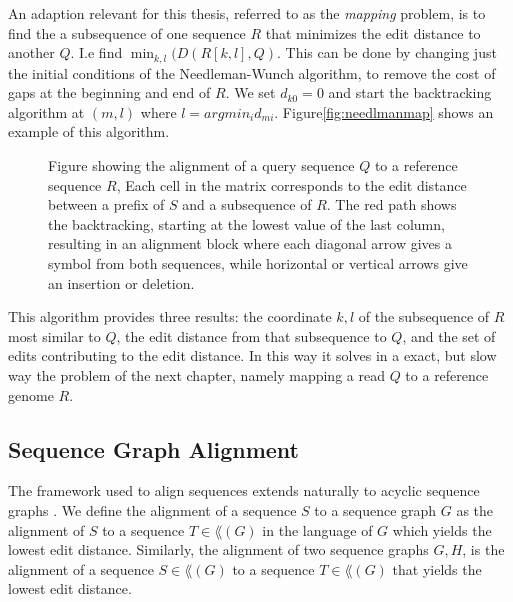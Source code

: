 An adaption relevant for this thesis, referred to as the \emph{mapping} problem, is to find the a subsequence of one sequence $R$ that minimizes the edit distance to another $Q$. I.e find $\min_{k, l}(D(R[k, l], Q)$.
This can be done by changing just the initial conditions of the Needleman-Wunch algorithm, to remove the cost of gaps at the beginning and end of $R$. We set $d_{k0} = 0$ and start the backtracking algorithm at $(m, l)$ where $l=arg min_i d_{mi}$. Figure\ref{fig:needlmanmap} shows an example of this algorithm.
\begin{figure}
  \begin{tikzpicture}
    
  \end{tikzpicture}
  \caption{Figure showing the alignment of a query sequence $Q$ to a reference sequence $R$, 
    Each cell in the matrix corresponds to the edit distance between a prefix of $S$ and a subsequence of  $R$. The red path shows the backtracking, starting at the lowest value of the last column, resulting in an alignment block where each diagonal arrow gives a symbol from both sequences, while horizontal or vertical arrows give an insertion or deletion.}
  \label{fig:needlemanmap}
\end{figure}
This algorithm provides three results: the coordinate $k, l$ of the subsequence of $R$ most similar to $Q$, the edit distance from that subsequence to $Q$, and the set of edits contributing to the edit distance. In this way it solves in a exact, but slow way the problem of the next chapter, namely mapping a read $Q$ to a reference genome $R$.

\subsection{Sequence Graph Alignment}
The framework used to align sequences extends naturally to acyclic sequence graphs \cite{hein, poa}. We define the alignment of a sequence $S$ to a sequence graph $G$ as the alignment of $S$ to a sequence $T \in \lang(G)$ in the language of $G$ which yields the lowest edit distance.
Similarly, the alignment of two sequence graphs $G, H$, is the alignment of a sequence $S \in \lang(G)$ to a sequence $T \in \lang(G)$ that yields the lowest edit distance. 

